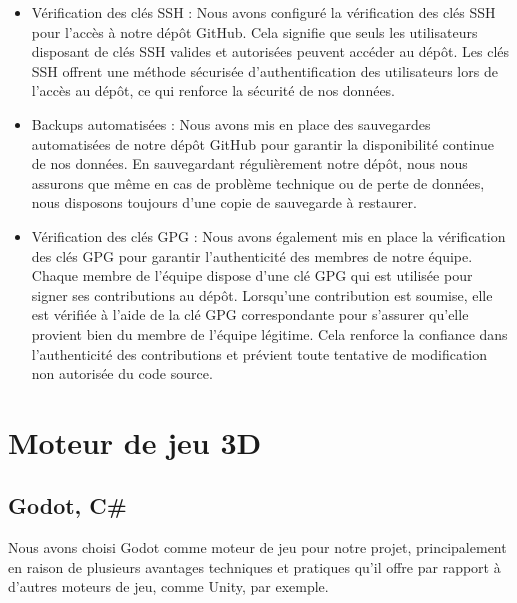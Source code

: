 \documentclass[
	article,			%
	11pt,				%
	oneside,			%
	a4paper,			%
	chapter=TITLE,
	french,			%
	sumario=tradicional
	]{base_nt}
\begin{document}
\begin{itemize}
    \item Vérification des clés SSH : Nous avons configuré la vérification des clés SSH pour l'accès à notre dépôt GitHub. Cela signifie que seuls les utilisateurs disposant de clés SSH valides et autorisées peuvent accéder au dépôt. Les clés SSH offrent une méthode sécurisée d'authentification des utilisateurs lors de l'accès au dépôt, ce qui renforce la sécurité de nos données.
    \item Backups automatisées : Nous avons mis en place des sauvegardes automatisées de notre dépôt GitHub pour garantir la disponibilité continue de nos données. En sauvegardant régulièrement notre dépôt, nous nous assurons que même en cas de problème technique ou de perte de données, nous disposons toujours d'une copie de sauvegarde à restaurer.
    \item Vérification des clés GPG : Nous avons également mis en place la vérification des clés GPG pour garantir l'authenticité des membres de notre équipe. Chaque membre de l'équipe dispose d'une clé GPG qui est utilisée pour signer ses contributions au dépôt. Lorsqu'une contribution est soumise, elle est vérifiée à l'aide de la clé GPG correspondante pour s'assurer qu'elle provient bien du membre de l'équipe légitime. Cela renforce la confiance dans l'authenticité des contributions et prévient toute tentative de modification non autorisée du code source.
\end{itemize}

\newpage

\section{Moteur de jeu 3D}

\subsection{Godot, C\#}

Nous avons choisi Godot comme moteur de jeu pour notre projet, principalement en raison de plusieurs avantages techniques et pratiques qu'il offre par rapport à d'autres moteurs de jeu, comme Unity, par exemple.
\end{document}

